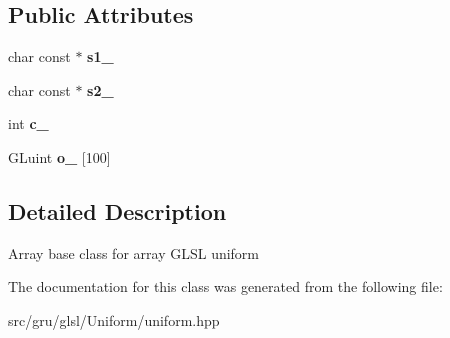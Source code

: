 \subsection*{\-Public \-Attributes}
\begin{DoxyCompactItemize}
\item 
\hypertarget{classglutpp_1_1glsl_1_1Uniform_1_1Vector_1_1Base_ab32678185a508e4806f05e5fd5ad813e}{char const $\ast$ {\bfseries s1\-\_\-}}\label{classglutpp_1_1glsl_1_1Uniform_1_1Vector_1_1Base_ab32678185a508e4806f05e5fd5ad813e}

\item 
\hypertarget{classglutpp_1_1glsl_1_1Uniform_1_1Vector_1_1Base_a7d9d882ba030dcd0b0c2cfceb0588393}{char const $\ast$ {\bfseries s2\-\_\-}}\label{classglutpp_1_1glsl_1_1Uniform_1_1Vector_1_1Base_a7d9d882ba030dcd0b0c2cfceb0588393}

\item 
\hypertarget{classglutpp_1_1glsl_1_1Uniform_1_1Vector_1_1Base_a16177fcc79cf039fee87f64761edf9c7}{int {\bfseries c\-\_\-}}\label{classglutpp_1_1glsl_1_1Uniform_1_1Vector_1_1Base_a16177fcc79cf039fee87f64761edf9c7}

\item 
\hypertarget{classglutpp_1_1glsl_1_1Uniform_1_1Vector_1_1Base_a5b253ae19e493fc0c8c27240fc184dc6}{\-G\-Luint {\bfseries o\-\_\-} \mbox{[}100\mbox{]}}\label{classglutpp_1_1glsl_1_1Uniform_1_1Vector_1_1Base_a5b253ae19e493fc0c8c27240fc184dc6}

\end{DoxyCompactItemize}


\subsection{\-Detailed \-Description}
\-Array base class for array \-G\-L\-S\-L uniform 

\-The documentation for this class was generated from the following file\-:\begin{DoxyCompactItemize}
\item 
src/gru/glsl/\-Uniform/uniform.\-hpp\end{DoxyCompactItemize}
